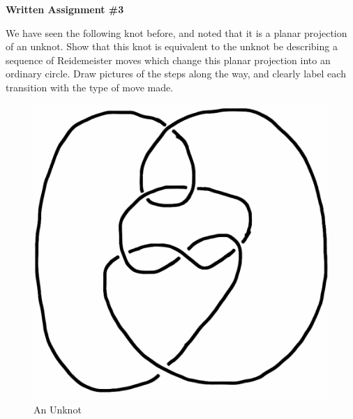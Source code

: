 \documentclass[12pt,letterpaper]{article}
\begin{document}
\setlength{\parskip}{1ex plus 0.5ex minus 0.2ex}
\setlength{\parindent}{0pt}

\pagestyle{fancy}
\lfoot{}
\rfoot{}

\begin{center}
{
\Large
\textbf{Written Assignment \#3}
}
\end{center}

We have seen the following knot before, and noted that it is a planar projection of an unknot.
Show that this knot is equivalent to the unknot be describing a sequence of Reidemeister moves which change this planar projection into an ordinary circle.
Draw pictures of the steps along the way, and clearly label each transition with the type of move made.

\vspace{1cm}



\begin{figure}[h]
    \centering
    \includegraphics[width=.7\textwidth]{meeting06pics/9SeptQ5b.png}
    \caption{An Unknot}
\end{figure}
\end{document}
